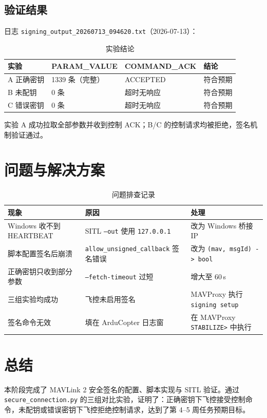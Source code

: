 \documentclass[12pt,a4paper]{article}
\begin{document}
\subsection{验证结果}

日志 \texttt{signing\_output\_20260713\_094620.txt}（2026-07-13）：

\begin{table}[htbp]
\centering
\caption{实验结论}
\begin{tabular}{p{3cm}p{3cm}p{3cm}p{4cm}}
\toprule
\textbf{实验} & \textbf{PARAM\_VALUE} & \textbf{COMMAND\_ACK} & \textbf{结论} \\
\midrule
A 正确密钥 & 1339 条（完整） & ACCEPTED & 符合预期 \\
B 未配钥 & 0 条 & 超时无响应 & 符合预期 \\
C 错误密钥 & 0 条 & 超时无响应 & 符合预期 \\
\bottomrule
\end{tabular}
\end{table}

实验 A 成功拉取全部参数并收到控制 ACK；B/C 的控制请求均被拒绝，签名机制验证通过。

\section{问题与解决方案}

\begin{table}[htbp]
\centering
\caption{问题排查记录}
\begin{tabular}{p{3.2cm}p{4.8cm}p{5.5cm}}
\toprule
\textbf{现象} & \textbf{原因} & \textbf{处理} \\
\midrule
Windows 收不到 HEARTBEAT & SITL \texttt{--out} 使用 \texttt{127.0.0.1} & 改为 Windows 桥接 IP \\
脚本配置签名后崩溃 & \texttt{allow\_unsigned\_callback} 签名错误 & 改为 \texttt{(mav, msgId) -> bool} \\
正确密钥只收到部分参数 & \texttt{--fetch-timeout} 过短 & 增大至 60\,s \\
三组实验均成功 & 飞控未启用签名 & MAVProxy 执行 \texttt{signing setup} \\
签名命令无效 & 填在 ArduCopter 日志窗 & 在 MAVProxy \texttt{STABILIZE>} 中执行 \\
\bottomrule
\end{tabular}
\end{table}

\section{总结}

本阶段完成了 MAVLink 2 安全签名的配置、脚本实现与 SITL 验证。通过 \texttt{secure\_connection.py} 的三组对比实验，证明了：正确密钥下飞控接受控制命令，未配钥或错误密钥下飞控拒绝控制请求，达到了第 4--5 周任务预期目标。
\end{document}
